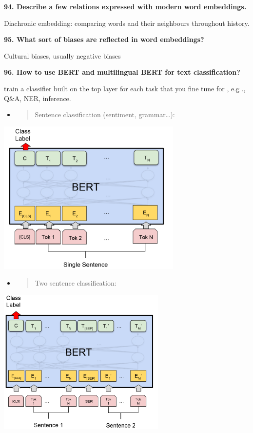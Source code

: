 \textbf{94. Describe a few relations expressed with modern word
embeddings.}

Diachronic embedding: comparing words and their neighbours throughout
history.

\textbf{95. What sort of biases are reflected in word embeddings?}

Cultural biases, usually negative biases

\textbf{96. How to use BERT and multilingual BERT for text
classification?}

train a classifier built on the top layer for each task that you fine
tune for , e.g ., Q\&A, NER, inference.

\begin{itemize}
\item
  \begin{quote}
  Sentence classification (sentiment, grammar\ldots):
  \end{quote}
\end{itemize}

\includegraphics[width=3.61979in,height=3.04856in]{media/image13.png}

\begin{itemize}
\item
  \begin{quote}
  Two sentence classification:
  \end{quote}
\end{itemize}

\includegraphics[width=3.29688in,height=2.8697in]{media/image19.png}

